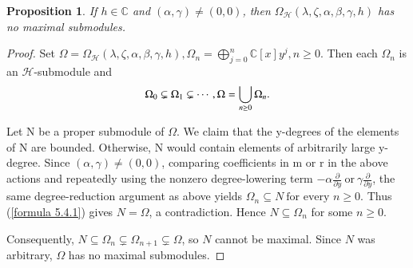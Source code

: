 \documentclass[12pt,reqno]{amsart}
\numberwithin{equation}{section}
\newtheorem{prop}[theo]{Proposition}
\begin{document}
\begin{prop}
    If $h\in\mathbb C$ and $(\alpha,\gamma)\ne(0,0)$, then
$\Omega_{\mathcal{H}}(\lambda,\zeta,\alpha,\beta,\gamma,h)$
has no maximal submodules.
\end{prop}
\begin{proof}

Set
$\Omega=\Omega_{\mathcal H}(\lambda,\zeta,\alpha,\beta,\gamma,h),
\Omega_n=\bigoplus_{j=0}^{n}\mathbb C[x]y^j
,n\ge0$.
Then each $\Omega_n$ is an $\mathcal H$-submodule and
\begin{equation}\label{formula 5.4.1}
\aligned
\Omega_0\subsetneq\Omega_1\subsetneq\cdots,
\Omega=\bigcup_{n\ge0}\Omega_n.
\endaligned
\end{equation}

Let N be a proper submodule of $\Omega$. We claim that the y-degrees of the elements of N are bounded. Otherwise, N would contain elements of arbitrarily large y-degree. Since $(\alpha,\gamma)\neq(0,0)$, comparing coefficients in m or r in the above actions and repeatedly using the nonzero degree-lowering term
$-\alpha\frac{\partial}{\partial{y}}\ \text{or}\ \gamma\frac{\partial}{\partial{y}}$,
the same degree-reduction argument as above yields
$\Omega_n\subseteq N\ \text{for every }n\ge0$.
Thus (\ref{formula 5.4.1}) gives $N=\Omega$, a contradiction. Hence
$N\subseteq\Omega_n$
for some $n\ge0$.

Consequently,
$N\subseteq\Omega_n
\subsetneq\Omega_{n+1}
\subsetneq\Omega$,
so $N$ cannot be maximal. Since $N$ was arbitrary, $\Omega$ has no maximal submodules.













    
\end{proof}
\end{document}
